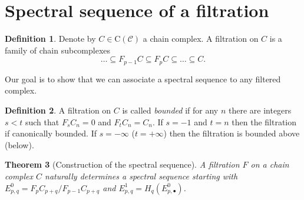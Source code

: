\documentclass[a4paper]{article}
\newcommand{\C}{\mathcal{C}}
\newcommand{\CC}{\textrm{C}(\C)}
\theoremstyle{plain}
\newtheorem{thm}{Theorem}[section]
\theoremstyle{definition}
\newtheorem{defn}[thm]{Definition}
\begin{document}
	\section{Spectral sequence of a filtration}
		\begin{defn}
			Denote by $C \in \CC$ a chain complex. A filtration on $C$ is a family of chain subcomplexes
			\[
				\dots \subseteq F_{p-1}C \subseteq F_pC \subseteq \dots \subseteq C.
			\]
		\end{defn}
		Our goal is to show that we can associate a spectral sequence to any filtered complex.
		\begin{defn}
			A filtration on $C$ is called \emph{bounded} if for any $n$ there are integers $s < t$ such that $F_sC_n = 0$ and $F_tC_n = C_n$. If $s = -1$ and $t = n$ then the filtration if canonically bounded. If $s = -\infty$ ($t = +\infty$) then the filtration is bounded above (below).
		\end{defn}
		\begin{thm}[Construction of the spectral sequence]
			\label{thm:spectral-seq-filtration}
			A filtration $F$ on a chain complex $C$ naturally determines a spectral sequence starting with $E^0_{p,q} = F_pC_{p+q}/F_{p-1}C_{p+q}$ and $E^1_{p,q} = H_q(E^0_{p,\bullet})$.
		\end{thm}
\end{document}
